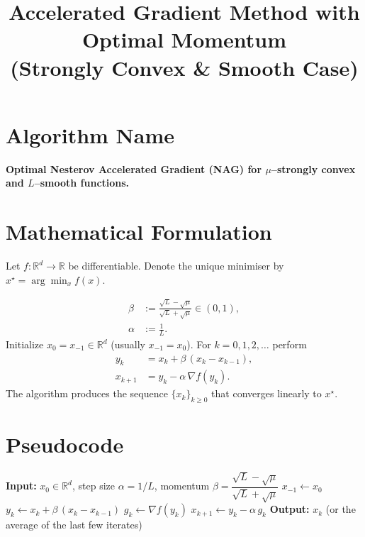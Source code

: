 \documentclass{article}
\title{Accelerated Gradient Method with Optimal Momentum\\
(Strongly Convex \& Smooth Case)}
\author{}
\date{}
\newcommand{\grad}{\nabla}
\newcommand{\R}{\mathbb{R}}
\begin{document}
\maketitle

\section*{Algorithm Name}
\textbf{Optimal Nesterov Accelerated Gradient (NAG) for $\mu$–strongly convex and $L$–smooth functions.}
\section*{Mathematical Formulation}
Let $f:\R^{d}\rightarrow\R$ be differentiable.  
Denote the unique minimiser by $x^{\star}=\arg\min_{x}f(x)$.  

\begin{align}
\beta &:=\frac{\sqrt{L}-\sqrt{\mu}}{\sqrt{L}+\sqrt{\mu}}\in(0,1), \tag{1}\\[4pt]
\alpha &:=\frac{1}{L}. \tag{2}
\end{align}
Initialize $x_{0}=x_{-1}\in\R^{d}$ (usually $x_{-1}=x_{0}$).  
For $k=0,1,2,\dots$ perform
\begin{align}
y_{k} &= x_{k}+ \beta\,(x_{k}-x_{k-1}), \tag{3}\\
x_{k+1} &= y_{k}-\alpha\,\grad f(y_{k}). \tag{4}
\end{align}
The algorithm produces the sequence $\{x_{k}\}_{k\ge 0}$ that converges linearly to $x^{\star}$.
\section*{Pseudocode}
\begin{algorithm}[H]
\caption{Optimal NAG}
\begin{algorithmic}[1]
\State \textbf{Input:} $x_{0}\in\R^{d}$, step size $\alpha=1/L$, momentum $\beta=\dfrac{\sqrt{L}-\sqrt{\mu}}{\sqrt{L}+\sqrt{\mu}}$
\State $x_{-1}\gets x_{0}$                                 
    \State $y_{k}\gets x_{k}+ \beta\,(x_{k}-x_{k-1})$      
    \State $g_{k}\gets \grad f(y_{k})$                     
    \State $x_{k+1}\gets y_{k}-\alpha\,g_{k}$              
\EndFor
\State \textbf{Output:} $x_{k}$ (or the average of the last few iterates)
\end{algorithmic}
\end{algorithm}
\end{document}
